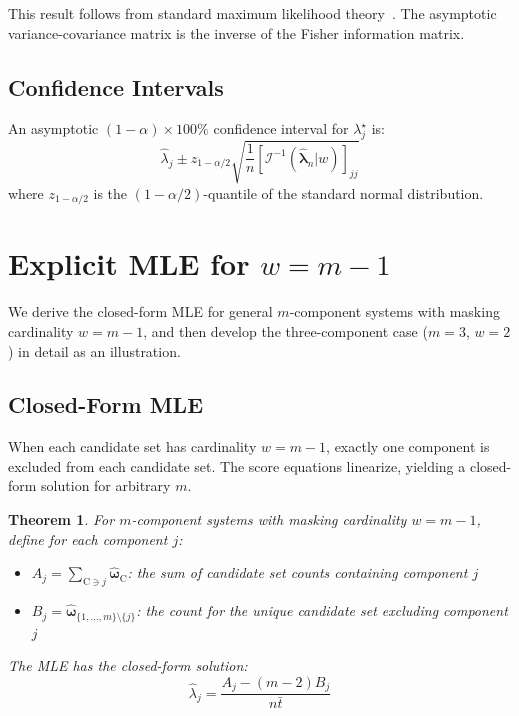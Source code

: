 \documentclass[12pt]{article}
\newcommand{\RV}[1]{\mathrm{#1}}
\newcommand{\cand}{\RV{C}}         %
\newcommand{\tparam}[1]{{#1}^{\star}}  %
\newcommand{\estimator}[1]{\hat{#1}}   %
\newcommand{\expomle}{\boldsymbol{\hat{\lambda}}_n}
\newcommand{\infomatrx}{\mathcal{I}}
\newcommand{\cntsymb}{\boldsymbol{\hat\omega}}
\newtheorem{theorem}{Theorem}[section]
\theoremstyle{definition}
\theoremstyle{remark}
\begin{document}
This result follows from standard maximum likelihood theory~\cite[Theorem~2.5.1]{bickel}. The asymptotic variance-covariance matrix is the inverse of the Fisher information matrix.

\subsection{Confidence Intervals}

An asymptotic $(1-\alpha) \times 100\%$ confidence interval for $\tparam{\lambda}_j$ is:
\begin{equation}
\label{eq:confidence_interval}
\estimator{\lambda}_j \pm z_{1-\alpha/2} \sqrt{\frac{1}{n} [\infomatrx^{-1}(\expomle | w)]_{jj}}
\end{equation}
where $z_{1-\alpha/2}$ is the $(1-\alpha/2)$-quantile of the standard normal distribution.

\section{Explicit MLE for \texorpdfstring{$w = m-1$}{w = m-1}}
\label{sec:three_component}

We derive the closed-form MLE for general $m$-component systems with masking cardinality $w = m-1$, and then develop the three-component case ($m=3$, $w=2$) in detail as an illustration.

\subsection{Closed-Form MLE}

When each candidate set has cardinality $w=m-1$, exactly one component is excluded from each candidate set. The score equations linearize, yielding a closed-form solution for arbitrary $m$.

\begin{theorem}
\label{thm:mle_general_wm1}
For $m$-component systems with masking cardinality $w = m-1$, define for each component $j$:
\begin{itemize}
\item $A_j = \sum_{\cand \ni j} \cntsymb_{\cand}$: the sum of candidate set counts containing component $j$
\item $B_j = \cntsymb_{\{1,\ldots,m\} \setminus \{j\}}$: the count for the unique candidate set excluding component $j$
\end{itemize}
The MLE has the closed-form solution:
\begin{equation}
\label{eq:expo_mle_general_wm1}
\estimator{\lambda}_j = \frac{A_j - (m-2)B_j}{n\bar{t}}
\end{equation}
\end{theorem}
\end{document}

